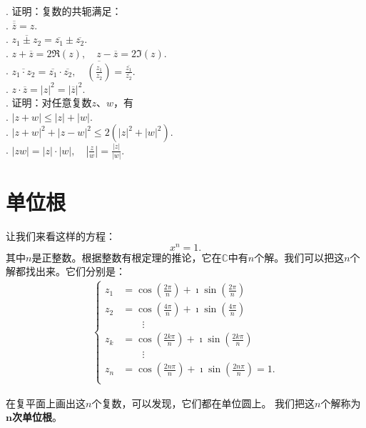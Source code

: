\documentclass[12pt,UTF8,fontset=none]{ctexbook}
\begin{document}
\begin{xt}
    . 证明：复数的共轭满足：\\
    . $ \overline{\overline{z}} = z.$ \\
    . $ \overline{z_1 \pm z_2} = \overline{z_1}\pm \overline{z_2}.$ \\
    . $ z + \overline{z} = 2\Re(z), \quad z - \overline{z} = 2\Im(z).$\\
    . $\displaystyle\overline{z_1 \cdot z_2} = \overline{z_1}\cdot \overline{z_2}, \quad \overline{\left(\frac{z_1}{z_2}\right)} = \frac{\overline{z_1}}{\overline{z_2}}.$ \\
    . $ z\cdot \overline{z} = |z|^2 = |\overline{z}|^2.$ \\
    . 证明：对任意复数$z$、$w$，有\\
    . $ |z + w| \leqslant |z| + |w|.$ \\
    . $ |z + w|^2 + |z - w|^2 \leqslant 2(|z|^2 + |w|^2).$ \\
    . $ \displaystyle|zw| = |z|\cdot |w|, \quad \left|\frac{z}{w}\right| = \frac{|z|}{|w|}. $
\end{xt}

\section{单位根}

让我们来看这样的方程：
$$ x^n = 1.$$
其中$n$是正整数。根据整数有根定理的推论，它在$\mathbb{C}$中有$n$个解。我们可以把这$n$个解都找出来。它们分别是：
\begin{align*}
    \begin{cases}
        z_1 &= \cos{\left(\frac{2\pi}{n}\right)} + \imath \sin{\left(\frac{2\pi}{n}\right)} \\
        z_2 &= \cos{\left(\frac{4\pi}{n}\right)} + \imath \sin{\left(\frac{4\pi}{n}\right)} \\
        & \quad\quad \vdots \\[-4pt]
        z_k &= \cos{\left(\frac{2k\pi}{n}\right)} + \imath \sin{\left(\frac{2k\pi}{n}\right)} \\
        & \quad\quad \vdots \\[-4pt]
        z_n &= \cos{\left(\frac{2n\pi}{n}\right)} + \imath \sin{\left(\frac{2n\pi}{n}\right)} = 1. \\
    \end{cases}
\end{align*}

在复平面上画出这$n$个复数，可以发现，它们都在单位圆上。
我们把这$n$个解称为$\boldsymbol{n}$\textbf{次单位根}。
\end{document}
